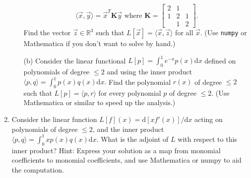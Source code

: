 \documentclass[11pt,fleqn]{article}
\begin{document}
\begin{enumerate}
\begin{itemize}
	\[\langle\vec{x},\vec{y}\rangle = \vec{x}^T\mathbf{K}\vec{y}\text{ where }\mathbf{K} = \left[\begin{array}{ccc}2&1&\\1&2&1\\&1&2\end{array}\right].\]
	Find the vector $\vec{z}\in\mathbb{R}^3$ such that $L[\vec{x}] = \langle\vec{x},\vec{z}\rangle$ for all $\vec{x}$. (Use {\tt numpy} or Mathematica if you don't want to solve by hand.)
	\item[(b)] Consider the linear functional $L[p] = \int_0^1 e^{-x}p(x)\mathrm{d}x$ defined on polynomials of degree $\le 2$ and using the inner product $\langle p,q\rangle = \int_0^1p(x)q(x)\mathrm{d}x.$ Find the polynomial $r(x)$ of degree $\le 2$ such that $L[p] = \langle p,r\rangle$ for every polynomial $p$ of degree $\le 2$.  (Use Mathematica or similar to speed up the analysis.)
	\end{itemize}
\item Consider the linear function $L[f](x) = \mathrm{d}[xf'(x)]/\mathrm{d}x$ acting on polynomials of degree $\le 2$, and the inner product $\langle p,q\rangle = \int_0^1 x p(x) q(x)\mathrm{d}x$. What is the adjoint of $L$ with respect to this inner product? Hint: Express your solution as a map from monomial coefficients to monomial coefficients, and use Mathematica or numpy to aid the computation.
\end{enumerate}
 
\end{document}
